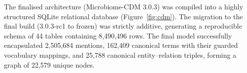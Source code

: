 \documentclass[referee,lineno,pdflatex,sn-vancouver-num]{sn-jnl}
\theoremstyle{thmstyleone}%
\theoremstyle{thmstyletwo}%
\theoremstyle{thmstylethree}%
\begin{document}
The finalised architecture (Microbiome-CDM 3.0.3) was compiled into a highly
structured SQLite relational database (Figure~\ref{fig:cdm}). The migration to the final build
(3.0.3-rc1 to frozen) was strictly additive, generating a reproducible schema
of 44 tables containing 8,490,496 rows. The final model successfully
encapsulated 2,505,684 mentions, 162,409 canonical terms with their guarded
vocabulary mappings, and 25,788 canonical entity--relation triples, forming
a graph of 22,579 unique nodes.
\end{document}
